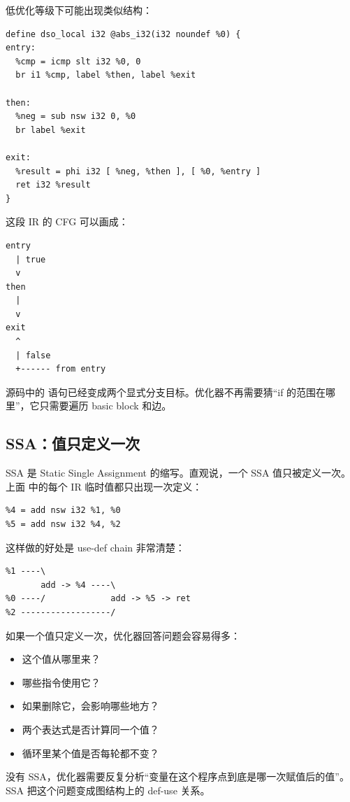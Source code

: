 低优化等级下可能出现类似结构：

\begin{lstlisting}
define dso_local i32 @abs_i32(i32 noundef %0) {
entry:
  %cmp = icmp slt i32 %0, 0
  br i1 %cmp, label %then, label %exit

then:
  %neg = sub nsw i32 0, %0
  br label %exit

exit:
  %result = phi i32 [ %neg, %then ], [ %0, %entry ]
  ret i32 %result
}
\end{lstlisting}

这段 IR 的 CFG 可以画成：

\begin{lstlisting}
entry
  | true
  v
then
  |
  v
exit
  ^
  | false
  +------ from entry
\end{lstlisting}

源码中的  语句已经变成两个显式分支目标。优化器不再需要猜“if 的范围在哪里”，它只需要遍历 basic block 和边。

\subsection{SSA：值只定义一次}

SSA 是 Static Single Assignment 的缩写。直观说，一个 SSA 值只被定义一次。上面  中的每个 IR 临时值都只出现一次定义：

\begin{lstlisting}
%4 = add nsw i32 %1, %0
%5 = add nsw i32 %4, %2
\end{lstlisting}

这样做的好处是 use-def chain 非常清楚：

\begin{lstlisting}
%1 ----\
       add -> %4 ----\
%0 ----/             add -> %5 -> ret
%2 ------------------/
\end{lstlisting}

如果一个值只定义一次，优化器回答问题会容易得多：

\begin{itemize}
  \item 这个值从哪里来？
  \item 哪些指令使用它？
  \item 如果删除它，会影响哪些地方？
  \item 两个表达式是否计算同一个值？
  \item 循环里某个值是否每轮都不变？
\end{itemize}

没有 SSA，优化器需要反复分析“变量在这个程序点到底是哪一次赋值后的值”。SSA 把这个问题变成图结构上的 def-use 关系。

